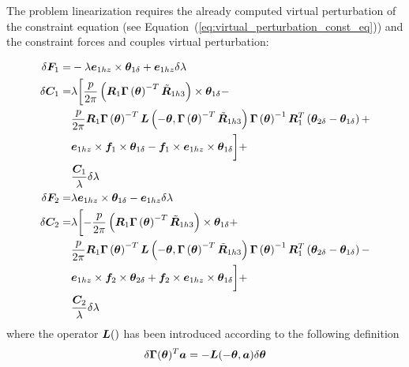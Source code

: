 The problem linearization requires the already computed virtual perturbation of the 
constraint equation (see Equation~(\ref{eq:virtual_perturbation_const_eq})) and 
the constraint forces and couples virtual perturbation:

\begin{align}
        \delta\bm{F}_1 =& -\lambda\bm{e}_{1hz} \times \bm{\theta}_{1\delta} + \bm{e}_{1hz} \delta\lambda  
	\label{eq:F1_virtual_variation}
	\\
        \nonumber
	\delta\bm{C}_1 =& \lambda \biggl[\frac{p}{2\pi}\left( \bm{R}_1\bm{\Gamma}\left( \bm{\theta} \right)^{-T}\tilde{\bm{R}}_{1h3} \right)\times\bm{\theta}_{1\delta} - \\ 
					\nonumber
                                        & \frac{p}{2\pi} \bm{R}_1\bm{\Gamma}\left( \bm{\theta} \right)^{-T}
					\bm{L}\left( -\bm{\theta}, \bm{\Gamma}\left( \bm{\theta} \right)^{-T}\tilde{\bm{R}}_{1h3} \right)\bm{\Gamma}\left( \bm{\theta} \right)^{-1}\bm{R}_1^T\left( \bm{\theta}_{2\delta} - \bm{\theta}_{1\delta} \right) + \\
					\nonumber
                                        & \bm{e}_{1hz}\times\bm{f}_1\times\bm{\theta}_{1\delta} -\bm{f}_1\times\bm{e}_{1hz}\times\bm{\theta}_{1\delta} \biggr] + \\
                                        & \frac{\bm{C}_1}{\lambda} \delta\lambda\\
        \delta\bm{F}_2 =& \lambda\bm{e}_{1hz} \times \bm{\theta}_{1\delta} - \bm{e}_{1hz} \delta\lambda
	\label{eq:F2_virtual_variation}
	\\ 
        \nonumber
	\delta\bm{C}_2 =& \lambda \biggl[-\frac{p}{2\pi}\left( \bm{R}_1\bm{\Gamma}\left( \bm{\theta} \right)^{-T}\tilde{\bm{R}}_{1h3} \right)\times\bm{\theta}_{1\delta} + \\
	                           \nonumber
				   &\frac{p}{2\pi} \bm{R}_1\bm{\Gamma}\left( \bm{\theta} \right)^{-T} \bm{L}\left( -\bm{\theta}, \bm{\Gamma}\left( \bm{\theta} \right)^{-T}\tilde{\bm{R}}_{1h3} \right)
				    \bm{\Gamma}\left( \bm{\theta} \right)^{-1}\bm{R}_1^T\left( \bm{\theta}_{2\delta} - \bm{\theta}_{1\delta} \right) - \\
				    \nonumber
                                   &\bm{e}_{1hz}\times\bm{f}_2\times\bm{\theta}_{2\delta} + \bm{f}_2\times\bm{e}_{1hz}\times\bm{\theta}_{1\delta}    
		           \biggr] + \\
		          &\frac{\bm{C}_2}{\lambda}\delta\lambda
\end{align}      
where the operator $\bm{L}()$ has been introduced according to the following 
definition
\begin{equation}
  \delta\bm{\Gamma}(\bm{\theta})^T\bm{a}= -\bm{L}(-\bm{\theta}, \bm{a})\delta\bm{\theta} 
  \label{L_definition}
\end{equation}
